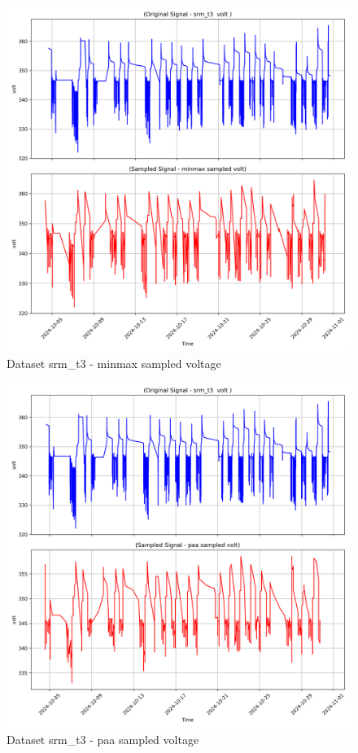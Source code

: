 \begin{figure}
    \centering
    \includegraphics[width=1\linewidth]{screenshots/srm_t3/minmax_sampled_volt_screenshot.png}
    \caption{Dataset srm\_t3 - minmax sampled voltage }
    \label{fig:srm_t3_minmax_sampled_volt_screenshot}
\end{figure}
\begin{figure}
    \centering
    \includegraphics[width=1\linewidth]{screenshots/srm_t3/paa_sampled_volt_screenshot.png}
    \caption{Dataset srm\_t3 - paa sampled voltage }
    \label{fig:srm_t3_paa_sampled_volt_screenshot}
\end{figure}
